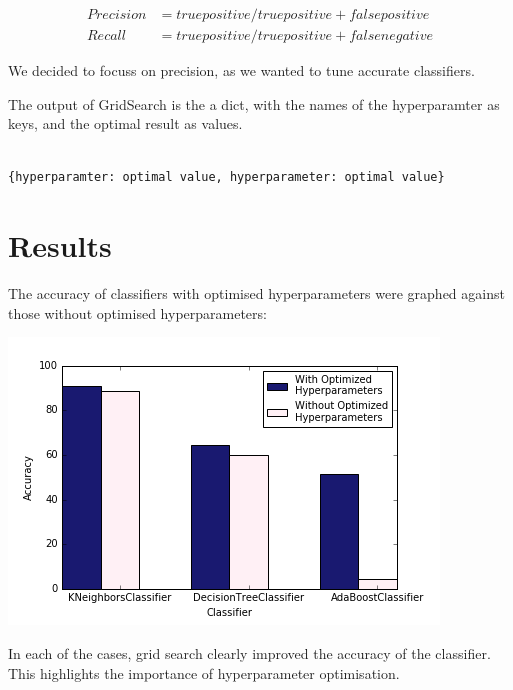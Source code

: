 \documentclass{article}
\begin{document}
\begin{align*}
Precision &= true positive / true positive + false positive\\
Recall &= true positive / true positive + false negative 
\end{align*}

We decided to focuss on precision, as we wanted to tune accurate classifiers. 

The output of GridSearch is the a dict, with the names of the hyperparamter as keys, and the optimal result as values. 

\begin{lstlisting}

{hyperparamter: optimal value, hyperparameter: optimal value}
\end{lstlisting}

\section{Results}

The accuracy of classifiers with optimised hyperparameters were graphed against those without optimised hyperparameters:

\includegraphics[scale=0.7]{acc_class}

In each of the cases, grid search clearly improved the accuracy of the classifier. This highlights the importance of hyperparameter optimisation. 



\end{document}
